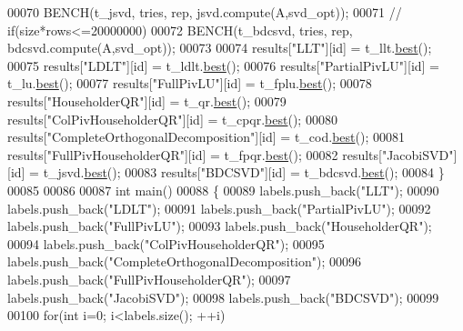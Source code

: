 \begin{DoxyCode}
00070     BENCH(t\_jsvd, tries, rep, jsvd.compute(A,svd\_opt));
00071 \textcolor{comment}{//   if(size*rows<=20000000)}
00072     BENCH(t\_bdcsvd, tries, rep, bdcsvd.compute(A,svd\_opt));
00073   
00074   results[\textcolor{stringliteral}{"LLT"}][id] = t\_llt.\hyperlink{class_eigen_1_1_bench_timer_ae8b673b0fa356d3432c7a65c79e8af0e}{best}();
00075   results[\textcolor{stringliteral}{"LDLT"}][id] = t\_ldlt.\hyperlink{class_eigen_1_1_bench_timer_ae8b673b0fa356d3432c7a65c79e8af0e}{best}();
00076   results[\textcolor{stringliteral}{"PartialPivLU"}][id] = t\_lu.\hyperlink{class_eigen_1_1_bench_timer_ae8b673b0fa356d3432c7a65c79e8af0e}{best}();
00077   results[\textcolor{stringliteral}{"FullPivLU"}][id] = t\_fplu.\hyperlink{class_eigen_1_1_bench_timer_ae8b673b0fa356d3432c7a65c79e8af0e}{best}();
00078   results[\textcolor{stringliteral}{"HouseholderQR"}][id] = t\_qr.\hyperlink{class_eigen_1_1_bench_timer_ae8b673b0fa356d3432c7a65c79e8af0e}{best}();
00079   results[\textcolor{stringliteral}{"ColPivHouseholderQR"}][id] = t\_cpqr.\hyperlink{class_eigen_1_1_bench_timer_ae8b673b0fa356d3432c7a65c79e8af0e}{best}();
00080   results[\textcolor{stringliteral}{"CompleteOrthogonalDecomposition"}][id] = t\_cod.\hyperlink{class_eigen_1_1_bench_timer_ae8b673b0fa356d3432c7a65c79e8af0e}{best}();
00081   results[\textcolor{stringliteral}{"FullPivHouseholderQR"}][id] = t\_fpqr.\hyperlink{class_eigen_1_1_bench_timer_ae8b673b0fa356d3432c7a65c79e8af0e}{best}();
00082   results[\textcolor{stringliteral}{"JacobiSVD"}][id] = t\_jsvd.\hyperlink{class_eigen_1_1_bench_timer_ae8b673b0fa356d3432c7a65c79e8af0e}{best}();
00083   results[\textcolor{stringliteral}{"BDCSVD"}][id] = t\_bdcsvd.\hyperlink{class_eigen_1_1_bench_timer_ae8b673b0fa356d3432c7a65c79e8af0e}{best}();
00084 \}
00085 
00086 
00087 \textcolor{keywordtype}{int} main()
00088 \{
00089   labels.push\_back(\textcolor{stringliteral}{"LLT"});
00090   labels.push\_back(\textcolor{stringliteral}{"LDLT"});
00091   labels.push\_back(\textcolor{stringliteral}{"PartialPivLU"});
00092   labels.push\_back(\textcolor{stringliteral}{"FullPivLU"});
00093   labels.push\_back(\textcolor{stringliteral}{"HouseholderQR"});
00094   labels.push\_back(\textcolor{stringliteral}{"ColPivHouseholderQR"});
00095   labels.push\_back(\textcolor{stringliteral}{"CompleteOrthogonalDecomposition"});
00096   labels.push\_back(\textcolor{stringliteral}{"FullPivHouseholderQR"});
00097   labels.push\_back(\textcolor{stringliteral}{"JacobiSVD"});
00098   labels.push\_back(\textcolor{stringliteral}{"BDCSVD"});
00099 
00100   \textcolor{keywordflow}{for}(\textcolor{keywordtype}{int} i=0; i<labels.size(); ++i)

\end{DoxyCode}
